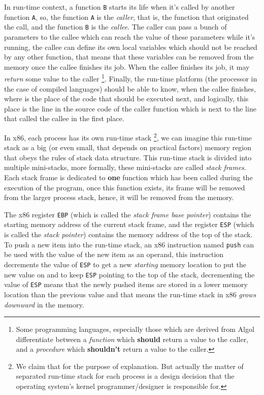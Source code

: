 In run-time context, a function \lstinline!B! starts its life when it's
called by another function \lstinline!A!, so, the function \lstinline!A!
is the \emph{caller}, that is, the function that originated the call,
and the function \lstinline!B! is the \emph{callee}. The caller can pass
a bunch of parameters to the callee which can reach the value of these
parameters while it's running, the callee can define its own local
variables which should not be reached by any other function, that means
that these variables can be removed from the memory once the callee
finishes its job. When the callee finishes its job, it may \emph{return}
some value to the caller \footnote{Some programming languages,
  especially those which are derived from Algol differentiate between a
  \emph{function} which \textbf{should} return a value to the caller,
  and a \emph{procedure} which \textbf{shouldn't} return a value to the
  caller.}. Finally, the run-time platform (the processor in the case of
compiled languages) should be able to know, when the callee finishes,
where is the place of the code that should be executed next, and
logically, this place is the line in the source code of the caller
function which is next to the line that called the callee in the first
place.

In x86, each process has its own run-time stack \footnote{We claim that
  for the purpose of explanation. But actually the matter of separated
  run-time stack for each process is a design decision that the
  operating system's kernel programmer/designer is responsible for.}, we
can imagine this run-time stack as a big (or even small, that depends on
practical factors) memory region that obeys the rules of stack data
structure. This run-time stack is divided into multiple mini-stacks,
more formally, these mini-stacks are called \emph{stack frames}. Each
stack frame is dedicated to \textbf{one} function which has been called
during the execution of the program, once this function exists, its
frame will be removed from the larger process stack, hence, it will be
removed from the memory.

The x86 register \lstinline!EBP! (which is called the \emph{stack frame
base pointer}) contains the starting memory address of the current stack
frame, and the register \lstinline!ESP! (which is called the \emph{stack
pointer}) contains the memory address of the top of the stack. To push a
new item into the run-time stack, an x86 instruction named
\lstinline!push! can be used with the value of the new item as an
operand, this instruction decrements the value of \lstinline!ESP! to get
a new \emph{starting} memory location to put the new value on and to
keep \lstinline!ESP! pointing to the top of the stack, decrementing the
value of \lstinline!ESP! means that the newly pushed items are stored in
a lower memory location than the previous value and that means the
run-time stack in x86 \emph{grows downward} in the memory.

